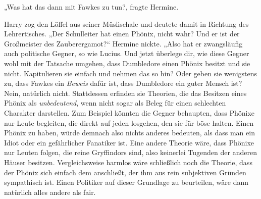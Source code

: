 „Was hat das dann mit Fawkes zu tun?, fragte Hermine.

Harry zog den Löffel aus seiner Müslischale und deutete damit in Richtung des Lehrertisches. „Der Schulleiter hat einen Phönix, nicht wahr? Und er ist der Großmeister des Zauberergamot?“ Hermine nickte.
%
„Also hat er zwangsläufig auch politische Gegner, so wie Lucius. Und jetzt überlege dir, wie diese Gegner wohl mit der Tatsache umgehen, dass Dumbledore einen Phönix besitzt und sie nicht. Kapitulieren sie einfach und nehmen das so hin? Oder geben sie wenigstens zu, dass Fawkes ein \emph{Beweis} dafür ist, dass Dumbledore ein guter Mensch ist? Nein, natürlich nicht. Stattdessen erfinden sie Theorien, die das Besitzen eines Phönix als \emph{unbedeutend}, wenn nicht sogar als Beleg für einen schlechten Charakter darstellen.
%
Zum Beispiel könnten die Gegner behaupten, dass Phönixe nur Leute begleiten, die direkt auf jeden losgehen, den sie für böse halten. Einen Phönix zu haben, würde demnach also nichts anderes bedeuten, als dass man ein Idiot oder ein gefährlicher Fanatiker ist. Eine andere Theorie wäre, dass Phönixe nur Leuten folgen, die reine Gryffindors sind, also keinerlei Tugenden der anderen Häuser besitzen. Vergleichsweise harmlos wäre schließlich noch die Theorie, dass der Phönix sich einfach dem anschließt, der ihm aus rein subjektiven Gründen sympathisch ist. Einen Politiker auf dieser Grundlage zu beurteilen, wäre dann natürlich alles andere als fair.
